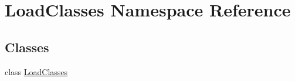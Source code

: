 \hypertarget{namespaceLoadClasses}{\section{Load\-Classes Namespace Reference}
\label{namespaceLoadClasses}
}
\subsection*{Classes}
\begin{DoxyCompactItemize}
\item 
class \hyperlink{classLoadClasses_1_1LoadClasses}{Load\-Classes}
\end{DoxyCompactItemize}
